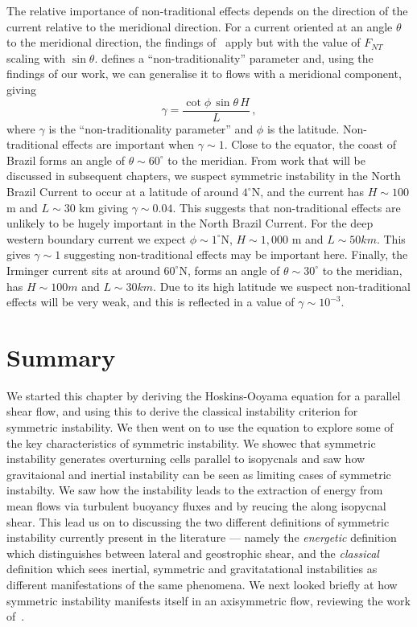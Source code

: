     The relative importance of non-traditional effects depends on the direction of the current relative to the meridional direction. For a current oriented at an angle $\theta$ to the meridional direction, the findings of~\citet{Zeitlin2018a} apply but with the value of $F_{NT}$ scaling with $\sin \theta$. \citet{Zeitlin2018a} defines a ``non-traditionality'' parameter and, using the findings of our work, we can generalise it to flows with a meridional component, giving
    \begin{equation}
        \gamma = \frac{\cot\phi\,\sin \theta\,H}{L} \, ,
    \end{equation}
    where $\gamma$ is the  ``non-traditionality parameter'' and $\phi$ is the latitude. Non-traditional effects are important when $\gamma \sim 1$. Close to the equator, the coast of Brazil forms an angle of $\theta \sim 60^\circ$ to the meridian. From work that will be discussed in subsequent chapters, we suspect symmetric instability in the North Brazil Current to occur at a latitude of around $4^\circ$N, and the current has $H\sim100$ m and $L\sim30$ km giving $\gamma \sim 0.04$. This suggests that non-traditional effects are unlikely to be hugely important in the North Brazil Current. For the deep western boundary current we expect $\phi \sim 1^\circ$N, $H\sim 1,000$ m and $L \sim 50 km$. This gives $\gamma \sim 1$ suggesting non-traditional effects may be important here. Finally, the Irminger current sits at around $60^\circ$N, forms an angle of $\theta \sim 30^\circ$ to the meridian, has $H \sim 100 m$ and $L \sim 30 km$. Due to its high latitude we suspect non-traditional effects will be very weak, and this is reflected in a value of $\gamma \sim 10^{-3}$.

\section{Summary}
We started this chapter by deriving the Hoskins-Ooyama equation for a parallel shear flow, and using this to derive the classical instability criterion for symmetric instability. We then went on to use the equation to explore some of the key characteristics of symmetric instability. We showec that symmetric instability generates overturning cells parallel to isopycnals and saw how gravitaional and inertial instability can be seen as limiting cases of symmetric instabilty. We saw how the instability leads to the extraction of energy from mean flows via turbulent buoyancy fluxes and by reucing the along isopycnal shear. This lead us on to discussing the two different definitions of symmetric instability currently present in the literature --- namely the \textit{energetic} definition which distinguishes between lateral and geostrophic shear, and the \textit{classical} definition which sees inertial, symmetric and gravitatational instabilities as different manifestations of the same phenomena. We next looked briefly at how symmetric instability manifests itself in an axisymmetric flow, reviewing the work of~\citet{Buckingham2021}.

